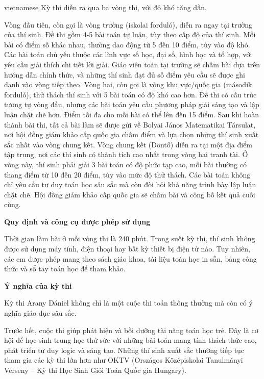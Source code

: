 \documentclass{article}
\begin{document}
\begin{otherlanguage*}{vietnamese}
Kỳ thi diễn ra qua ba vòng thi, với độ khó tăng dần.
\begin{enumerate}[topsep=0pt, partopsep=0pt, itemsep=0pt]
    \ii Vòng đầu tiên, còn gọi là vòng trường (iskolai forduló), diễn ra ngay tại trường của thí sinh. Đề thi gồm 4-5 bài toán tự luận, tùy theo cấp độ của thí sinh.
    Mỗi bài có điểm số khác nhau, thường dao động từ 5 đến 10 điểm, tùy vào độ khó. Các bài toán chủ yếu thuộc các lĩnh vực số học, đại số, hình học và tổ hợp,
    với yêu cầu giải thích chi tiết lời giải. Giáo viên toán tại trường sẽ chấm bài dựa trên hướng dẫn chính thức, và những thí sinh đạt đủ số điểm yêu cầu sẽ được ghi danh vào vòng tiếp theo.
    \ii Vòng hai, còn gọi là vòng khu vực/quốc gia (második forduló), thử thách thí sinh với 5 bài toán có độ khó cao hơn. Đề thi có cấu trúc tương tự vòng đầu,
    nhưng các bài toán yêu cầu phương pháp giải sáng tạo và lập luận chặt chẽ hơn. Điểm tối đa cho mỗi bài có thể lên đến 15 điểm.
    Sau khi hoàn thành bài thi, tất cả bài làm sẽ được gửi về Bolyai János Matematikai Társulat,
    nơi hội đồng giám khảo cấp quốc gia chấm điểm và lựa chọn những thí sinh xuất sắc nhất vào vòng chung kết.
    \ii Vòng chung kết (Döntő) diễn ra tại một địa điểm tập trung, nơi các thí sinh có thành tích cao nhất trong vòng hai tranh tài.
    Ở vòng này, thí sinh phải giải 3 bài toán có độ phức tạp cao, mỗi bài thường có thang điểm từ 10 đến 20 điểm, tùy vào mức độ thử thách.
    Các bài toán không chỉ yêu cầu tư duy toán học sâu sắc mà còn đòi hỏi khả năng trình bày lập luận chặt chẽ. Hội đồng giám khảo cấp quốc gia sẽ chấm bài và công bố kết quả cuối cùng.
\end{enumerate}

\textbf{Quy định và công cụ được phép sử dụng}

Thời gian làm bài ở mỗi vòng thi là 240 phút. Trong suốt kỳ thi, thí sinh không được sử dụng máy tính, điện thoại hay bất kỳ thiết bị điện tử nào.
Tuy nhiên, các em được phép mang theo sách giáo khoa, tài liệu toán học in sẵn, bảng công thức và sổ tay toán học để tham khảo.

\textbf{Ý nghĩa của kỳ thi}

Kỳ thi Arany Dániel không chỉ là một cuộc thi toán thông thường mà còn có ý nghĩa giáo dục sâu sắc.

Trước hết, cuộc thi giúp phát hiện và bồi dưỡng tài năng toán học trẻ. Đây là cơ hội để học sinh trung học thử sức với những bài toán mang tính thách thức cao,
phát triển tư duy logic và sáng tạo. Những thí sinh xuất sắc thường tiếp tục tham gia các kỳ thi lớn hơn như OKTV (Országos Középiskolai Tanulmányi Verseny – Kỳ thi Học Sinh Giỏi Toán Quốc gia Hungary).


\end{otherlanguage*}
\end{document}
